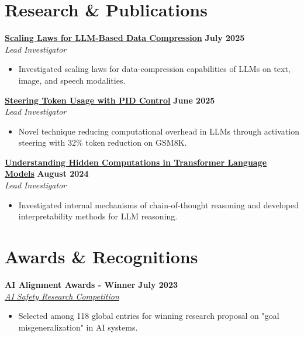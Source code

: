 \documentclass[11pt]{article}
\begin{document}
\section{Research \& Publications}

\textbf{\href{https://fullwrong.com/2025/07/23/scaling-compression/}{Scaling Laws for LLM-Based Data Compression}} \hfill \textbf{July 2025} \\
\textit{Lead Investigator}
\begin{itemize}[leftmargin=*, nosep]
\item Investigated scaling laws for data-compression capabilities of LLMs on text, image, and speech modalities.
\end{itemize}

\textbf{\href{https://arxiv.org/abs/2506.18831}{Steering Token Usage with PID Control}} \hfill \textbf{June 2025} \\
\textit{Lead Investigator}
\begin{itemize}[leftmargin=*, nosep]
\item Novel technique reducing computational overhead in LLMs through activation steering with 32\% token reduction on GSM8K.
\end{itemize}

\textbf{\href{https://arxiv.org/html/2412.04537}{Understanding Hidden Computations in Transformer Language Models}} \hfill \textbf{August 2024} \\
\textit{Lead Investigator}
\begin{itemize}[leftmargin=*, nosep]
\item Investigated internal mechanisms of chain-of-thought reasoning and developed interpretability methods for LLM reasoning.
\end{itemize}

\section{Awards \& Recognitions}

\textbf{AI Alignment Awards - Winner} \hfill \textbf{July 2023} \\
\textit{\href{https://www.lesswrong.com/posts/zFoAAD7dfWdczxoLH/winners-of-ai-alignment-awards-research-contest}{AI Safety Research Competition}}
\begin{itemize}[leftmargin=*, nosep]
\item Selected among 118 global entries for winning research proposal on "goal misgeneralization" in AI systems.
\end{itemize}
\end{document}

